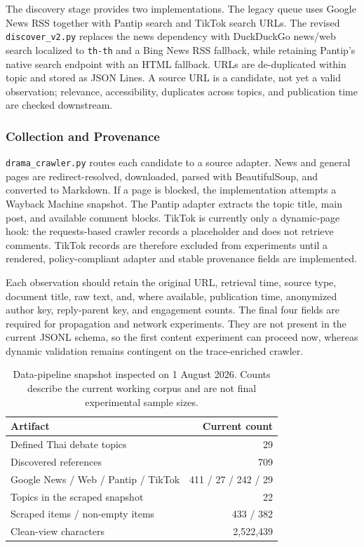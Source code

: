 \documentclass[conference]{IEEEtran}
\begin{document}
The discovery stage provides two implementations. The legacy queue uses Google
News RSS together with Pantip search and TikTok search URLs. The revised
\texttt{discover\_v2.py} replaces the news dependency with DuckDuckGo news/web
search localized to \texttt{th-th} and a Bing News RSS fallback, while retaining
Pantip's native search endpoint with an HTML fallback. URLs are de-duplicated
within topic and stored as JSON Lines. A source URL is a candidate, not yet a
valid observation; relevance, accessibility, duplicates across topics, and
publication time are checked downstream.

\subsubsection{Collection and Provenance}

\texttt{drama\_crawler.py} routes each candidate to a source adapter. News and
general pages are redirect-resolved, downloaded, parsed with BeautifulSoup,
and converted to Markdown. If a page is blocked, the implementation attempts a
Wayback Machine snapshot. The Pantip adapter extracts the topic title, main
post, and available comment blocks. TikTok is currently only a dynamic-page
hook: the requests-based crawler records a placeholder and does not retrieve
comments. TikTok records are therefore excluded from experiments until a
rendered, policy-compliant adapter and stable provenance fields are implemented.

Each observation should retain the original URL, retrieval time, source type,
document title, raw text, and, where available, publication time, anonymized
author key, reply-parent key, and engagement counts. The final four fields are
required for propagation and network experiments. They are not present in the
current JSONL schema, so the first content experiment can proceed now, whereas
dynamic validation remains contingent on the trace-enriched crawler.

\begin{table}[t]
\caption{Data-pipeline snapshot inspected on 1 August 2026. Counts describe
the current working corpus and are not final experimental sample sizes.}
\label{tab:data-snapshot}
\centering
\footnotesize
\begin{tabular}{@{}lr@{}}
\toprule
Artifact & Current count \\
\midrule
Defined Thai debate topics & 29 \\
Discovered references & 709 \\
\quad Google News / Web / Pantip / TikTok & 411 / 27 / 242 / 29 \\
Topics in the scraped snapshot & 22 \\
Scraped items / non-empty items & 433 / 382 \\
Clean-view characters & 2,522,439 \\
\bottomrule
\end{tabular}
\end{table}
\end{document}
